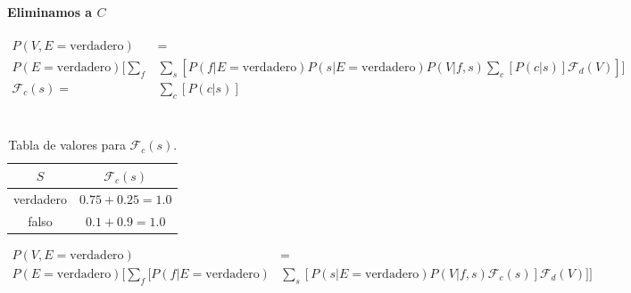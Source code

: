 \documentclass[12pt]{article}
\begin{document}
\paragraph{Eliminamos a $C$}
\begin{equation}
\begin{split}
P(V,E=\text{verdadero})&=\\
P(E=\text{verdadero})[\sum_{f}&\sum_{s}[P(f|E=\text{verdadero})P(s|E=\text{verdadero})P(V|f,s)\sum_{c}[P(c|s)]\mathcal{F}_d(V)]]\\
\mathcal{F}_c(s)=& \sum_{c}[P(c|s)]\\
\end{split}
\end{equation}\\
\begin{table}[h!]
	\centering
	\begin{tabular}{|c|c|}
		\hline
		\rowcolor[gray]{.8}
		$S$&$\mathcal{F}_c(s)$ \\\hline %
		verdadero & $0.75+0.25=1.0$\\\hline
		falso & $0.1 +0.9=1.0$\\\hline
	\end{tabular}
	\caption{Tabla de valores para $\mathcal{F}_c(s)$.}
	\label{tab:ej3008}
\end{table}
\begin{equation}
\begin{split}
P(V,E=\text{verdadero})&=\\
P(E=\text{verdadero})[\sum_{f}[P(f|E=\text{verdadero})&\sum_{s}[P(s|E=\text{verdadero})P(V|f,s)\mathcal{F}_c(s)]\mathcal{F}_d(V)]]\\
\end{split}
\end{equation}\\
\end{document}
